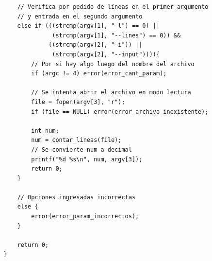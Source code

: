 \documentclass[a4paper, 10pt, twoside, notitlepage]{article}
\begin{document}
\begin{verbatim}
    // Verifica por pedido de líneas en el primer argumento 
    // y entrada en el segundo argumento
    else if (((strcmp(argv[1], "-l") == 0) || 
              (strcmp(argv[1], "--lines") == 0)) && 
             ((strcmp(argv[2], "-i")) || 
              (strcmp(argv[2], "--input")))){
        // Por si hay algo luego del nombre del archivo
        if (argc != 4) error(error_cant_param);

        // Se intenta abrir el archivo en modo lectura
        file = fopen(argv[3], "r");
        if (file == NULL) error(error_archivo_inexistente);

        int num;
        num = contar_lineas(file);
        // Se convierte num a decimal
        printf("%d %s\n", num, argv[3]);
        return 0;
    }     

    // Opciones ingresadas incorrectas
    else {
        error(error_param_incorrectos);
    }

    return 0;
}
\end{verbatim}
\end{document}

